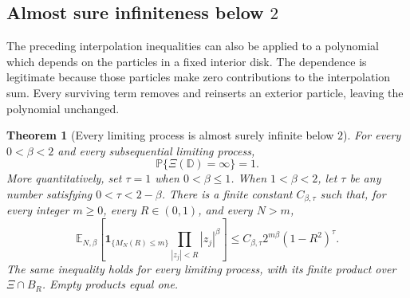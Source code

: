 \documentclass[11pt,a4paper]{article}
\numberwithin{equation}{section}
\newtheorem{theorem}{Theorem}[section]
\theoremstyle{definition}
\theoremstyle{remark}
\newcommand{\D}{\mathbb D}
\begin{document}
\subsection{Almost sure infiniteness below \texorpdfstring{$2$}{2}}

The preceding interpolation inequalities can also be applied to a
polynomial which depends on the particles in a fixed interior disk.
The dependence is legitimate because those particles make zero
contributions to the interpolation sum. Every surviving term removes
and reinserts an exterior particle, leaving the polynomial unchanged.

\begin{theorem}[Every limiting process is almost surely infinite below $2$]
\label{thm:almost-sure-infinite-below-two}
For every $0<\beta<2$ and every subsequential limiting process,
\begin{equation}
 \mathbb P\{\Xi(\D)=\infty\}=1.
 \label{eq:almost-sure-infinite-below-two}
\end{equation}
More quantitatively, set $\tau=1$ when $0<\beta\le1$. When
$1<\beta<2$, let $\tau$ be any number satisfying
$0<\tau<2-\beta$. There is a finite constant
$C_{\beta,\tau}$ such that, for every integer $m\ge0$, every
$R\in(0,1)$, and every $N>m$,
\begin{equation}
 \mathbb E_{N,\beta}
 \left[\mathbf1_{\{M_N(R)\le m\}}
                  \prod_{|z_j|<R}|z_j|^\beta\right]
 \le C_{\beta,\tau}2^{m\beta}(1-R^2)^\tau.
 \label{eq:finite-count-product-bound}
\end{equation}
The same inequality holds for every limiting process, with its
finite product over $\Xi\cap B_R$. Empty products equal one.
\end{theorem}
\end{document}
